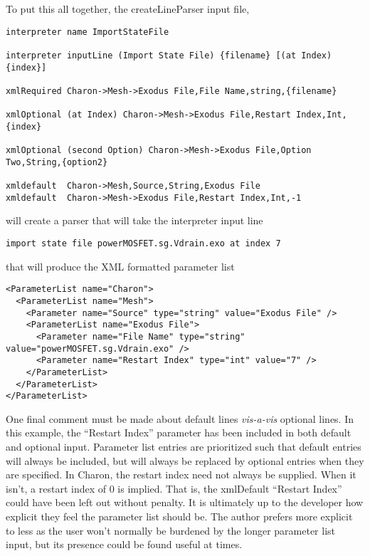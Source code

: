 To put this all together, the createLineParser input file,
\begin{lstlisting}
interpreter name ImportStateFile

interpreter inputLine (Import State File) {filename} [(at Index) {index}]

xmlRequired Charon->Mesh->Exodus File,File Name,string,{filename}

xmlOptional (at Index) Charon->Mesh->Exodus File,Restart Index,Int,{index}

xmlOptional (second Option) Charon->Mesh->Exodus File,Option Two,String,{option2}

xmldefault  Charon->Mesh,Source,String,Exodus File
xmldefault  Charon->Mesh->Exodus File,Restart Index,Int,-1
\end{lstlisting}
will create a parser that will take the interpreter input line
\begin{lstlisting}
import state file powerMOSFET.sg.Vdrain.exo at index 7
\end{lstlisting}
that will produce the XML formatted parameter list
\begin{lstlisting}
<ParameterList name="Charon">
  <ParameterList name="Mesh">
    <Parameter name="Source" type="string" value="Exodus File" />
    <ParameterList name="Exodus File">
      <Parameter name="File Name" type="string" value="powerMOSFET.sg.Vdrain.exo" />
      <Parameter name="Restart Index" type="int" value="7" />
    </ParameterList>
  </ParameterList>
</ParameterList>
\end{lstlisting}

One final comment must be made about default lines {\em vis-a-vis}
optional lines.  In this example, the ``Restart Index'' parameter has
been included in both default and optional input.  Parameter list
entries are prioritized such that default entries will always be
included, but will always be replaced by optional entries when they
are specified.  In Charon, the restart index need not always be
supplied.  When it isn't, a restart index of 0 is implied.  That is,
the xmlDefault ``Restart Index'' could have been left out without
penalty.  It is ultimately up to the developer how explicit they feel
the parameter list should be.  The author prefers more explicit to less
as the user won't normally be burdened by the longer parameter list
input, but its presence could be found useful at times.

